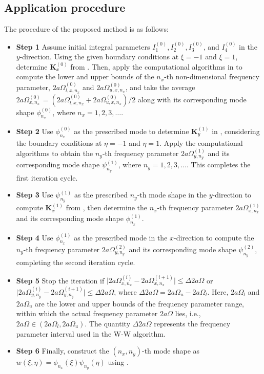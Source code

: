 \documentclass[preprint,12pt]{elsarticle}
\begin{document}
\subsection{Application procedure}\label{sec:Application procedure}
The procedure of the proposed method is as follows:   
\begin{itemize}[]
	\item \textbf{Step 1} Assume initial integral parameters \(I^{(0)}_1, I^{(0)}_2, I^{(0)}_3\), and \(I^{(0)}_4\) in the \(y\)-direction. Using the given boundary conditions at \(\xi = -1\) and \(\xi = 1\), determine \(\mathbf{K}^{(0)}_x\) from . 
	Then, apply the computational algorithms in  to compute the lower and upper bounds of the \(n_x\)-th non-dimensional frequency parameter, \(2a\Omega^{(0)}_{l,x,n_x}\) and \(2a\Omega^{(0)}_{u,x,n_x}\), and take the average \(2a\Omega^{(0)}_{x,n_x} = (2a\Omega^{(0)}_{l,x,n_x} + 2a\Omega^{(0)}_{u,x,n_x})/2\) along with its corresponding mode shape \(\phi^{(0)}_{n_x}\), where \(n_x = 1, 2, 3, \ldots\).
	
	\item \textbf{Step 2} Use \(\phi^{(0)}_{n_x}\) as the prescribed mode to determine \(\mathbf{K}^{(1)}_y\) in , considering the boundary conditions at \(\eta = -1\) and \(\eta = 1\). 
	Apply the computational algorithms to obtain the \(n_y\)-th frequency parameter \(2a\Omega^{(1)}_{y,n_y}\) and its corresponding mode shape \(\psi^{(1)}_{n_y}\), where \(n_y = 1, 2, 3, \ldots\). This completes the first iteration cycle.  
	
	\item \textbf{Step 3} Use \(\psi^{(1)}_{n_y}\) as the prescribed \(n_y\)-th mode shape in the \(y\)-direction to compute \(\mathbf{K}^{(1)}_x\) from , then determine the \(n_x\)-th frequency parameter \(2a\Omega^{(1)}_{x,n_x}\) and its corresponding mode shape \(\phi^{(1)}_{n_x}\).  
	
	\item \textbf{Step 4} Use \(\phi^{(1)}_{n_x}\) as the prescribed mode in the \(x\)-direction to compute the \(n_y\)-th frequency parameter \(2a\Omega^{(2)}_{y,n_y}\) and its corresponding mode shape \(\psi^{(2)}_{n_y}\), completing the second iteration cycle.  
	
	\item \textbf{Step 5} Stop the iteration if \(\lvert 2a\Omega^{(i)}_{x,n_x} - 2a\Omega^{(i+1)}_{x,n_x} \rvert \leq \Delta 2a\Omega\) or \(\lvert 2a\Omega^{(i)}_{y,n_y} - 2a\Omega^{(i+1)}_{y,n_y} \rvert \leq \Delta 2a\Omega\), where \(\Delta 2a\Omega = 2a\Omega_u - 2a\Omega_l\). Here, \(2a\Omega_l\) and \(2a\Omega_u\) are the lower and upper bounds of the frequency parameter range, within which the actual frequency parameter \(2a\Omega\) lies, i.e., \(2a\Omega \in (2a\Omega_l, 2a\Omega_u)\). The quantity \(\Delta 2a\Omega\) represents the frequency parameter interval used in the W-W algorithm.
	
	\item \textbf{Step 6} Finally, construct the \((n_x, n_y)\)-th mode shape as \(w(\xi, \eta) = \phi_{n_x}(\xi) \psi_{n_y}(\eta)\) using .  
\end{itemize}
\end{document}
